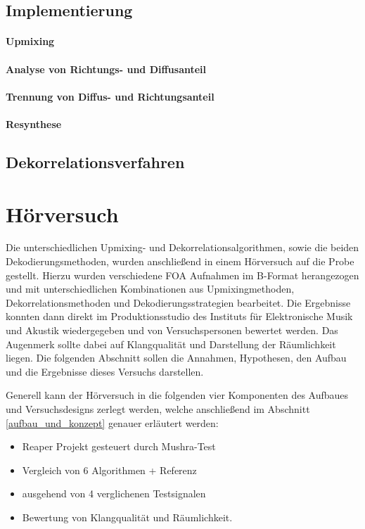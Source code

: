 \documentclass[12pt, a4paper]{article}
\begin{document}
    \subsection{Implementierung}
    
        \paragraph{Upmixing}
        
        \paragraph{Analyse von Richtungs- und Diffusanteil}
        
        \paragraph{Trennung von Diffus- und Richtungsanteil}
        
        \paragraph{Resynthese}
        

    \subsection{Dekorrelationsverfahren} \label{dekorrelation}
    

\newpage

\section{Hörversuch}
Die unterschiedlichen Upmixing- und Dekorrelationsalgorithmen, sowie die beiden Dekodierungsmethoden, wurden anschließend in einem Hörversuch auf die Probe gestellt. Hierzu wurden verschiedene FOA Aufnahmen im B-Format herangezogen und mit unterschiedlichen Kombinationen aus Upmixingmethoden, Dekorrelationsmethoden und Dekodierungsstrategien bearbeitet. Die Ergebnisse konnten dann direkt im Produktionsstudio des Instituts für Elektronische Musik und Akustik wiedergegeben und von Versuchspersonen bewertet werden. Das Augenmerk sollte dabei auf Klangqualität und Darstellung der Räumlichkeit liegen. Die folgenden Abschnitt sollen die Annahmen, Hypothesen, den Aufbau und die Ergebnisse dieses Versuchs darstellen.

Generell kann der Hörversuch in die folgenden vier Komponenten des Aufbaues und Versuchsdesigns zerlegt werden, welche anschließend im Abschnitt \ref{aufbau_und_konzept} genauer erläutert werden:
\begin{itemize}
    \item Reaper Projekt gesteuert durch Mushra-Test
    \item Vergleich von 6 Algorithmen + Referenz
    \item ausgehend von 4 verglichenen Testsignalen
    \item Bewertung von Klangqualität und Räumlichkeit.
\end{itemize}
\end{document}
